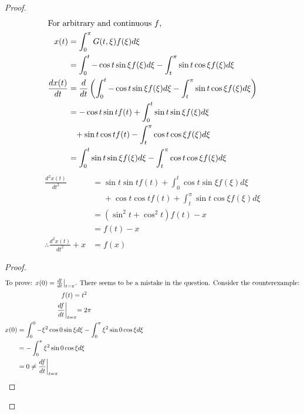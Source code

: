 \documentclass[12pt]{article}
\newenvironment{problem}[2][Problem]{\begin{trivlist}
\item[\hskip \labelsep {\bfseries #1}\hskip \labelsep {\bfseries #2.}]}{\end{trivlist}}
\begin{document}
\begin{problem}{3}
\end{problem}
\begin{proof}
\begin{align*}
	\shortintertext{For arbitrary and continuous $f$,}
	x(t) &= \int_0^\pi G(t,\xi)f(\xi) d\xi \\
	&= \int_0^t -\cos t\sin\xi f(\xi) d\xi - \int_t^\pi \sin t \cos\xi
		f(\xi) d\xi\\
	\frac{dx(t)}{dt} &= \frac{d}{dt} \left( 
			\int_0^t -\cos t\sin\xi f(\xi) d\xi - \int_t^\pi \sin t \cos\xi
			f(\xi) d\xi
		\right) \\
	&= -\cos t\sin t f(t) + \int_0^t \sin t\sin\xi f(\xi) d\xi \\
		&\phantom{=} + \sin t \cos t f(t) - \int_t^\pi \cos t \cos\xi f(\xi) d\xi \\
	&= \int_0^t \sin t\sin\xi f(\xi) d\xi 
		- \int_t^\pi \cos t \cos\xi f(\xi) d\xi \\
\end{align*}
\filbreak
\begin{align*}
	\frac{d^2x(t)}{dt^2} &= 
		\sin t\sin t f(t) + \int_0^t \cos t\sin\xi f(\xi) d\xi \\
		&\phantom{=} + \cos t\cos t f(t) + \int_t^\pi \sin t \cos\xi f(\xi) d\xi \\
	&= (\sin^2 t + \cos^2 t)f(t) - x \\
	&= f(t) - x \\
	\therefore \frac{d^2x(t)}{dt^2} + x &= f(x)
\end{align*}
\begin{proof}
\begin{gather*}
	\intertext{To prove: $x(0) = \frac{df}{dt}\bigl|_{t=\pi}$. There seems to
		be a mistake in the question. Consider the counterexample:}
	f(t) = t^2 \\
	\frac{df}{dt}\biggl|_{t=\pi} = 2\pi \\
	\begin{aligned}
	x(0) &= \int_0^0 -\xi^2 \cos 0\sin\xi d\xi - \int_0^\pi \xi^2 \sin 0 \cos\xi d\xi\\
	&= -\int_0^\pi \xi^2 \sin 0 \cos\xi d\xi\\
	&= 0 \ne \frac{df}{dt}\biggl|_{t=\pi}
	\end{aligned}
\end{gather*}
\end{proof}
\pagebreak


\end{proof}
\end{document}
